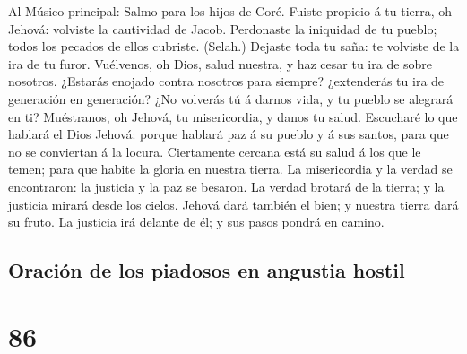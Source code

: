  Al Músico principal: Salmo para los hijos de Coré. Fuiste
propicio á tu tierra, oh Jehová: volviste la cautividad de Jacob.
 Perdonaste la iniquidad de tu pueblo; todos los pecados
de ellos cubriste. (Selah.)  Dejaste toda tu saña: te
volviste de la ira de tu furor.  Vuélvenos, oh Dios, salud
nuestra, y haz cesar tu ira de sobre nosotros.  ¿Estarás
enojado contra nosotros para siempre? ¿extenderás tu ira de generación
en generación?  ¿No volverás tú á darnos vida, y tu pueblo
se alegrará en ti?  Muéstranos, oh Jehová, tu
misericordia, y danos tu salud.  Escucharé lo que hablará
el Dios Jehová: porque hablará paz á su pueblo y á sus santos, para que
no se conviertan á la locura.  Ciertamente cercana está su
salud á los que le temen; para que habite la gloria en nuestra tierra.
 La misericordia y la verdad se encontraron: la justicia
y la paz se besaron.  La verdad brotará de la tierra; y
la justicia mirará desde los cielos.  Jehová dará también
el bien; y nuestra tierra dará su fruto.  La justicia irá
delante de él; y sus pasos pondrá en camino.

\hypertarget{oraciuxf3n-de-los-piadosos-en-angustia-hostil}{%
\subsection{Oración de los piadosos en angustia
hostil}\label{oraciuxf3n-de-los-piadosos-en-angustia-hostil}}

\hypertarget{section-85}{%
\section{86}\label{section-85}}

